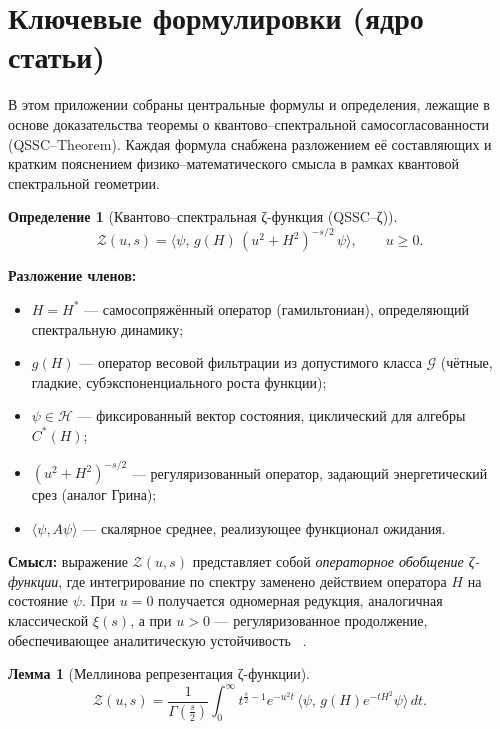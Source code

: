 \documentclass{article}
\numberwithin{equation}{section}
\theoremstyle{plain}
\newtheorem{lemma}{Лемма}
\theoremstyle{definition}
\newtheorem{definition}{Определение}
\theoremstyle{remark}
\def\infty{∞}\def\partial{∂}\def\sum{Σ}\def\int{∫}%
\begin{document}
\clearpage

\section{Ключевые формулировки (ядро статьи)}


\noindent
В этом приложении собраны центральные формулы и определения, 
лежащие в основе доказательства теоремы о квантово–спектральной самосогласованности (QSSC–Theorem).  
Каждая формула снабжена разложением её составляющих и кратким пояснением физико–математического смысла
в рамках квантовой спектральной геометрии.

\begin{definition}[Квантово–спектральная ζ-функция (QSSC–ζ)]
\label{def:QSSCZeta}
\begin{equation}
\boxed{
\mathcal Z(u,s)
= \big\langle \psi,\,
g(H)\,(u^2+H^2)^{-s/2}\,\psi \big\rangle,
\qquad u\ge0.
}
\end{equation}
\end{definition}

\noindent
\textbf{Разложение членов:}
\begin{itemize}
  \item \(H = H^\ast\) — самосопряжённый оператор (гамильтониан), определяющий спектральную динамику;
  \item \(g(H)\) — оператор весовой фильтрации из допустимого класса \(\mathcal G\) 
    (чётные, гладкие, субэкспоненциального роста функции);
  \item \(\psi\in\mathcal H\) — фиксированный вектор состояния, циклический для алгебры \(C^\ast(H)\);
  \item \((u^2+H^2)^{-s/2}\) — регуляризованный оператор, задающий энергетический срез (аналог Грина);
  \item \(\langle \psi, A \psi\rangle\) — скалярное среднее, реализующее функционал ожидания.
\end{itemize}

\noindent
\textbf{Смысл:} выражение \(\mathcal Z(u,s)\) представляет собой \emph{операторное обобщение ζ-функции},  
где интегрирование по спектру заменено действием оператора \(H\) на состояние \(\psi\).  
При \(u=0\) получается одномерная редукция, аналогичная классической \(\xi(s)\), 
а при \(u>0\) — регуляризованное продолжение, обеспечивающее аналитическую устойчивость ~\cite{Elizalde1995}.

\begin{lemma}[Меллинова репрезентация ζ-функции]
\label{lemma:melZ}
\begin{equation}
\boxed{
\mathcal Z(u,s)
= \frac{1}{\Gamma\!\left(\frac s2\right)}
\int_0^\infty t^{\frac s2-1} e^{-u^2 t}\,
\langle\psi,\,g(H)e^{-tH^2}\psi\rangle\,dt.
}
\end{equation}
\end{lemma}
\end{document}
